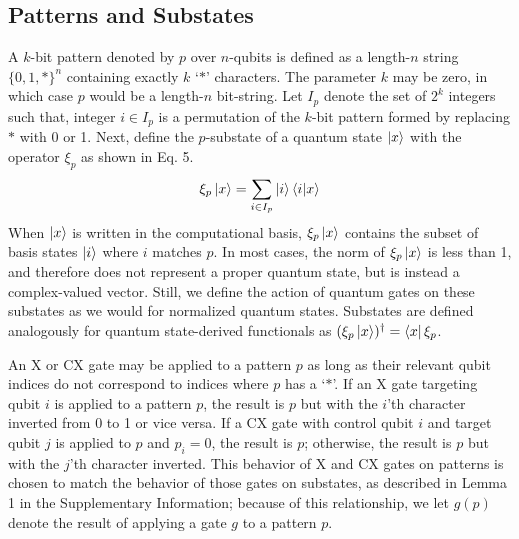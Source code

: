 \subsection{Patterns and Substates}
A $k$-bit pattern denoted by $p$ over $n$-qubits is defined as a length-$n$ string 
$\{0, 1, *\}^n$ containing exactly $k$ `$*$' characters. The parameter $k$
may be zero, in which case $p$ would be a length-$n$ bit-string. Let $I_p$ denote the set of $2^k$ integers such that, integer $i\in I_p$ is a permutation of the $k$-bit pattern formed by replacing $*$ with 0 or 1. Next, define the $p$-substate of a quantum state $\mathinner{|{x}\rangle}$ with the operator $\xi_p$ as shown in Eq. 5.
\begin{equation}
    \label{eq5}
     \xi_p\mathinner{|{x}\rangle} = \sum_{i \in I_p}{\mathinner{|{i}\rangle}\mathinner{\langle{i|x}\rangle}} 
\end{equation}
When $\mathinner{|{x}\rangle}$ is written in the computational basis, $\xi_p\mathinner{|{x}\rangle}$ contains the 
subset of basis states $\mathinner{|{i}\rangle}$ where $i$ matches $p$. In most cases, the norm of $\xi_p\mathinner{|{x}\rangle}$ is less than 1, and therefore does not represent a proper quantum state, 
but is instead a complex-valued vector. Still, we define the action of quantum gates
on these substates as we would for normalized quantum states. Substates are defined analogously for quantum state-derived functionals as $(\xi_p\mathinner{|{x}\rangle})^\dagger = \mathinner{\langle{x}|}\xi_p$.

An X or CX gate may be applied to a pattern $p$ as long as their relevant qubit
indices do not correspond to indices where $p$ has a `$*$'.
If an X gate targeting
qubit $i$ is applied to a pattern $p$, the result is $p$ but with the $i$'th
character inverted from 0 to 1 or vice versa. If a CX gate with control qubit $i$
and target qubit $j$ is applied to $p$ and $p_i = 0$, the result is $p$; otherwise,
the result is $p$ but with the $j$'th character inverted. This behavior of X and CX
gates on patterns is chosen to match the behavior of those gates on substates, 
as described in Lemma 1 in the Supplementary Information; because of this relationship, we let $g(p)$ denote the
result of applying a gate $g$ to a pattern $p$.

